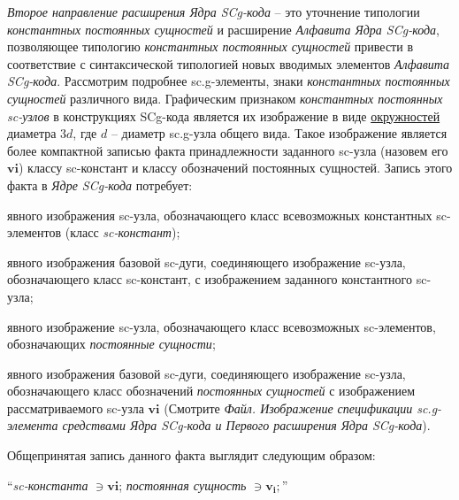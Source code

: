 \textit{Второе направление расширения Ядра SCg-кода} -- это уточнение типологии \textit{константных постоянных сущностей} и расширение \textit{Алфавита Ядра SCg-кода}, позволяющее типологию \textit{константных постоянных сущностей} привести в соответствие с синтаксической типологией новых вводимых элементов \textit{Алфавита SCg-кода}. Рассмотрим подробнее sc.g-элементы, знаки \textit{константных постоянных сущностей} различного вида. Графическим признаком \textit{константных постоянных sc-узлов} в конструкциях SCg-кода является их изображение в виде \uline{окружностей} диаметра $3d$, где $d$ -- диаметр sc.g-узла общего вида. Такое изображение является более компактной записью факта принадлежности заданного sc-узла (назовем его $\bm{vi}$) классу sc-констант и классу обозначений постоянных сущностей. Запись этого факта в \textit{Ядре SCg-кода} потребует:
\begin{textitemize}
	\item явного изображения sc-узла, обозначающего класс всевозможных константных sc-элементов (класс \textit{sc-констант});  
	\item явного изображения базовой sc-дуги, соединяющего изображение sc-узла, обозначающего класс sc-констант, с изображением заданного константного sc-узла; 
	\item явного изображение sc-узла, обозначающего класс всевозможных sc-элементов, обозначающих \textit{постоянные сущности};
	\item явного изображения базовой sc-дуги, соединяющего изображение sc-узла, обозначающего класс обозначений \textit{постоянных сущностей} с изображением рассматриваемого sc-узла $\bm{vi}$ (Смотрите \textit{Файл. Изображение спецификации sc.g-элемента средствами Ядра SCg-кода и Первого расширения Ядра SCg-кода}).
\end{textitemize}

\bigskip
Общепринятая запись данного факта выглядит следующим образом:

``\textit{sc-константа} $\ni \bm{vi}$; \textit{постоянная сущность} $\ni \bm{v_i};$''
\bigskip


